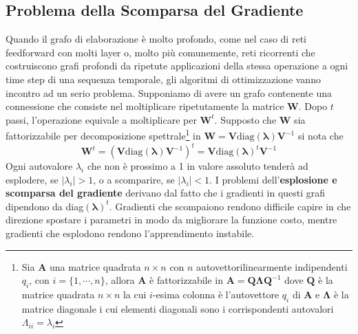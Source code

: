 \documentclass[12pt,a4paper]{report}
\begin{document}
    \subsection{Problema della Scomparsa del Gradiente}
    Quando il grafo di elaborazione \`e molto profondo, come nel caso
    di reti feedforward con molti layer o, molto pi\`u comunemente, reti
    ricorrenti che costruiscono grafi profondi da ripetute applicazioni
    della stessa operazione a ogni time step di una sequenza temporale,
    gli algoritmi di ottimizzazione vanno incontro ad un serio problema.
    Supponiamo di avere un grafo contenente una connessione che consiste
    nel moltiplicare ripetutamente la matrice $\boldsymbol{W}$. Dopo $t$
    passi, l'operazione equivale a moltiplicare per $\boldsymbol{W}^t$.
    Supposto che $\boldsymbol{W}$ sia fattorizzabile per decomposizione
    spettrale\footnote{Sia $\boldsymbol{A}$ una matrice quadrata 
    $n\times n$ con $n$ autovettori\footnotemark linearmente 
    indipendenti $q_i$, con $i=\{1,\cdots,n\}$, allora $\boldsymbol{A}$
    \`e fattorizzabile in $\boldsymbol{A}=\boldsymbol{Q}
    \boldsymbol{\Lambda}\boldsymbol{Q}^{-1}$ dove $\boldsymbol{Q}$ \`e 
    la matrice quadrata $n\times n$ la cui $i$-esima colonna \`e 
    l'autovettore $q_i$ di $\boldsymbol{A}$ e $\boldsymbol{\Lambda}$ \`e
    la matrice diagonale i cui elementi diagonali sono i corrispondenti
    autovalori $\Lambda_{ii}=\lambda_i$} in 
    $\boldsymbol{W}=\boldsymbol{V}\text{diag}(\boldsymbol{\lambda})
    \boldsymbol{V}^{-1}$ si nota che
    \begin{equation}
        \boldsymbol{W}^t=(\boldsymbol{V}\text{diag}
        (\boldsymbol{\lambda})\boldsymbol{V}^{-1})^t=
        \boldsymbol{V}\text{diag}(\boldsymbol{\lambda})^t
        \boldsymbol{V}^{-1}
    \end{equation}
    Ogni autovalore $\lambda_i$ che non \`e prossimo a 1 in valore 
    assoluto tender\`a ad esplodere, se $|\lambda_i|>1$, o a scomparire,
    se $|\lambda_i|<1$. I problemi dell'\textbf{esplosione e scomparsa
    del gradiente} derivano dal fatto che i gradienti in questi grafi
    dipendono da diag$(\boldsymbol{\lambda})^t$. Gradienti che 
    scompaiono rendono difficile capire in che direzione spostare i 
    parametri in modo da migliorare la funzione costo, mentre gradienti
    che esplodono rendono l'apprendimento instabile.
\end{document}
